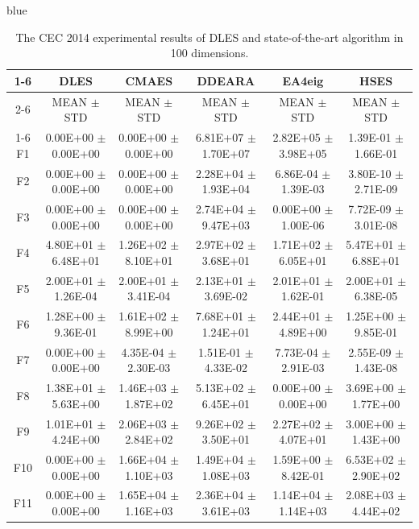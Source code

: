 \documentclass[journal, onecolumn]{IEEEtran}
\begin{document}
\begin{color}{blue}
\begin{table}[htbp!]
	\centering
	\caption{The CEC 2014 experimental results of DLES and state-of-the-art algorithm in 100 dimensions.}
	\label{CEC2014_100}
		\begin{tabular}{c|ccccc}
			\cline{1-6}
				 &	DLES			 &	CMAES				 &	DDEARA				 &	EA4eig				 &	HSES			\\	\cline{2-6}	
			&	MEAN	$\pm$	STD	 &	MEAN	$\pm$	STD		 &	MEAN	$\pm$	STD		 &	MEAN	$\pm$	STD		 &	MEAN	$\pm$	STD	\\	\cline{1-6}	
			F1	 &	0.00E+00	$\pm$	0.00E+00	 &	0.00E+00	$\pm$	0.00E+00		 &	6.81E+07	$\pm$	1.70E+07		 &	2.82E+05	$\pm$	3.98E+05		 &	1.39E-01	$\pm$	1.66E-01	\\		
			F2	 &	0.00E+00	$\pm$	0.00E+00	 &	0.00E+00	$\pm$	0.00E+00		 &	2.28E+04	$\pm$	1.93E+04		 &	6.86E-04	$\pm$	1.39E-03		 &	3.80E-10	$\pm$	2.71E-09	\\		
			F3	 &	0.00E+00	$\pm$	0.00E+00	 &	0.00E+00	$\pm$	0.00E+00		 &	2.74E+04	$\pm$	9.47E+03		 &	0.00E+00	$\pm$	1.00E-06		 &	7.72E-09	$\pm$	3.01E-08	\\		
			F4	 &	4.80E+01	$\pm$	6.48E+01	 &	1.26E+02	$\pm$	8.10E+01		 &	2.97E+02	$\pm$	3.68E+01		 &	1.71E+02	$\pm$	6.05E+01		 &	5.47E+01	$\pm$	6.88E+01	\\		
			F5	 &	2.00E+01	$\pm$	1.26E-04	 &	2.00E+01	$\pm$	3.41E-04		 &	2.13E+01	$\pm$	3.69E-02		 &	2.01E+01	$\pm$	1.62E-01		 &	2.00E+01	$\pm$	6.38E-05	\\		
			F6	 &	1.28E+00	$\pm$	9.36E-01	 &	1.61E+02	$\pm$	8.99E+00		 &	7.68E+01	$\pm$	1.24E+01		 &	2.44E+01	$\pm$	4.89E+00		 &	1.25E+00	$\pm$	9.85E-01	\\		
			F7	 &	0.00E+00	$\pm$	0.00E+00	 &	4.35E-04	$\pm$	2.30E-03		 &	1.51E-01	$\pm$	4.33E-02		 &	7.73E-04	$\pm$	2.91E-03		 &	2.55E-09	$\pm$	1.43E-08	\\		
			F8	 &	1.38E+01	$\pm$	5.63E+00	 &	1.46E+03	$\pm$	1.87E+02		 &	5.13E+02	$\pm$	6.45E+01		 &	0.00E+00	$\pm$	0.00E+00		 &	3.69E+00	$\pm$	1.77E+00	\\		
			F9	 &	1.01E+01	$\pm$	4.24E+00	 &	2.06E+03	$\pm$	2.84E+02		 &	9.26E+02	$\pm$	3.50E+01		 &	2.27E+02	$\pm$	4.07E+01		 &	3.00E+00	$\pm$	1.43E+00	\\		
			F10	 &	0.00E+00	$\pm$	0.00E+00	 &	1.66E+04	$\pm$	1.10E+03		 &	1.49E+04	$\pm$	1.08E+03		 &	1.59E+00	$\pm$	8.42E-01		 &	6.53E+02	$\pm$	2.90E+02	\\		
			F11	 &	0.00E+00	$\pm$	0.00E+00	 &	1.65E+04	$\pm$	1.16E+03		 &	2.36E+04	$\pm$	3.61E+03		 &	1.14E+04	$\pm$	1.14E+03		 &	2.08E+03	$\pm$	4.44E+02	\\		

\end{tabular}
\end{table}
\end{color}
\end{document}
